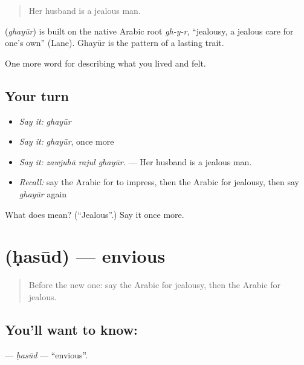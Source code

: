 \begin{quote}
Her husband is a jealous man.
\end{quote}

\begin{cousinweb}
\textbf{} (\emph{ghayūr}) is built on the native Arabic root \emph{gh-y-r}, \textquotedblleft{}jealousy, a jealous care for one's own\textquotedblright{} (Lane). Ghayūr is the pattern of a lasting trait.
\end{cousinweb}

\begin{grammarlens}[title={What you've built}]
One more word for describing what you lived and felt.
\end{grammarlens}

\subsection*{Your turn}
\begin{itemize}
\raggedright
  \item \emph{Say it:} \emph{ghayūr}
  \item \emph{Say it:} \emph{ghayūr}, once more
  \item \emph{Say it:} \emph{zawjuhā rajul ghayūr.} — Her husband is a jealous man.
  \item \emph{Recall:} say the Arabic for to impress, then the Arabic for jealousy, then say \emph{ghayūr} again
\end{itemize}

\begin{tcolorbox}[breakable,colback=teal!4,colframe=teal!35!black,title={Before you move on}]
What does  mean? (\textquotedblleft{}Jealous\textquotedblright{}.) Say it once more.
\end{tcolorbox}
\section[\texorpdfstring{\ar{حسود} (ḥasūd)}{حسود (ḥasūd)}]{ (ḥasūd) — envious}

\label{lesson:AR-C492-hasud}



\begin{quote}
Before the new one: say the Arabic for jealousy, then the Arabic for jealous.
\end{quote}

\subsection*{You'll want to know: }
\textbf{} — \emph{ḥasūd} — \textquotedblleft{}envious\textquotedblright{}.


